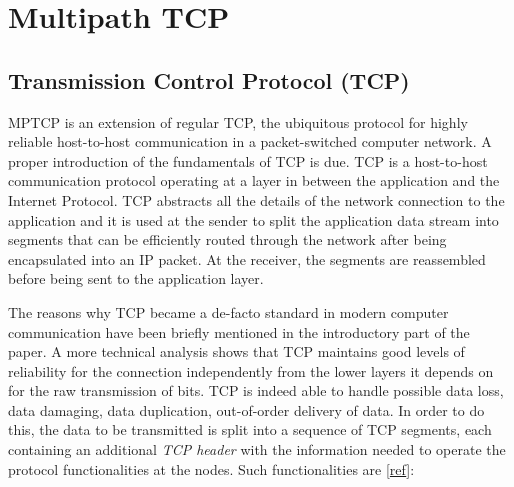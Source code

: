 \chapter{Multipath TCP}
\label{chap:multipathtcp}

\section{Transmission Control Protocol (TCP)}
MPTCP is an extension of regular TCP, the ubiquitous protocol for highly reliable host-to-host communication in a packet-switched computer network. A proper introduction of the fundamentals of TCP is due.
TCP is a host-to-host communication protocol operating at a layer in between the application and the Internet Protocol. TCP abstracts all the details of the network connection to the application and it is used at the sender to split the application data stream into segments that can be efficiently routed through the network after being encapsulated into an IP packet. At the receiver, the segments are reassembled before being sent to the application layer.

The reasons why TCP became a de-facto standard in modern computer communication have been briefly mentioned in the introductory part of the paper. A more technical analysis shows that TCP maintains good levels of reliability for the connection independently from the lower layers it depends on for the raw transmission of bits. TCP is indeed able to handle possible data loss, data damaging, data duplication, out-of-order delivery of data. In order to do this, the data to be transmitted is split into a sequence of TCP segments, each containing an additional \textit{TCP header} with the information needed to operate the protocol functionalities at the nodes. Such functionalities are [\href{https://tools.ietf.org/html/rfc793}{ref}]:

